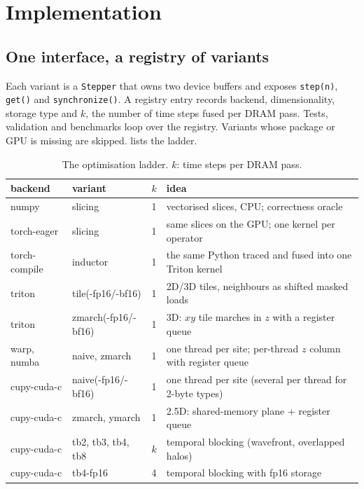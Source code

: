 \documentclass[11pt]{article}
\newcommand{\code}[1]{\texttt{#1}}
\begin{document}
\section{Implementation}
\subsection{One interface, a registry of variants}
Each variant is a \code{Stepper} that owns two device buffers and exposes \code{step(n)},
\code{get()} and \code{synchronize()}. A registry entry records backend, dimensionality,
storage type and $k$, the number of time steps fused per DRAM pass. Tests, validation and
benchmarks loop over the registry. Variants whose package or GPU is missing are skipped.
 lists the ladder.

\begin{table}[t]
\centering\small
\caption{The optimisation ladder. $k$: time steps per DRAM pass.}
\label{tab:ladder}
\begin{tabular}{@{}lllp{7.4cm}@{}}
\toprule
backend & variant & $k$ & idea \\
\midrule
numpy & slicing & 1 & vectorised slices, CPU; correctness oracle \\
torch-eager & slicing & 1 & same slices on the GPU; one kernel per operator \\
torch-compile & inductor & 1 & the same Python traced and fused into one Triton kernel \\
triton & tile(-fp16/-bf16) & 1 & 2D/3D tiles, neighbours as shifted masked loads \\
triton & zmarch(-fp16/-bf16) & 1 & 3D: $xy$ tile marches in $z$ with a register queue \\
warp, numba & naive, zmarch & 1 & one thread per site; per-thread $z$ column with register queue \\
cupy-cuda-c & naive(-fp16/-bf16) & 1 & one thread per site (several per thread for 2-byte types) \\
cupy-cuda-c & zmarch, ymarch & 1 & 2.5D: shared-memory plane + register queue~\cite{micikevicius2009fd} \\
cupy-cuda-c & tb2, tb3, tb4, tb8 & $k$ & temporal blocking (wavefront, overlapped halos) \\
cupy-cuda-c & tb4-fp16 & 4 & temporal blocking with fp16 storage \\
\bottomrule
\end{tabular}
\end{table}
\end{document}
